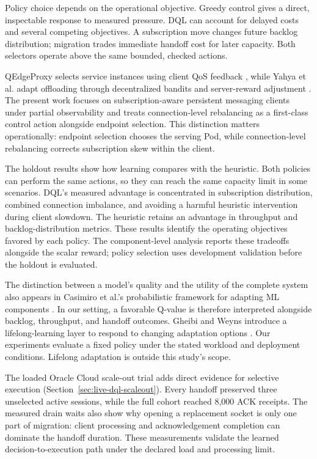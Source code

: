 \documentclass[manuscript,nonacm]{acmart}
\begin{document}
Policy choice depends on the operational objective. Greedy control gives a
direct, inspectable response to measured pressure. DQL can account for delayed
costs and several competing objectives. A subscription move changes future
backlog distribution; migration trades immediate handoff cost for later
capacity. Both selectors operate above the same bounded, checked actions.

QEdgeProxy selects service instances using client QoS feedback
\cite{Cilic2025}, while Yahya et al. adapt offloading through decentralized
bandits and server-reward adjustment \cite{Yahya2024}. The present work
focuses on subscription-aware persistent messaging clients under partial
observability and treats connection-level rebalancing as a first-class
control action alongside endpoint selection. This distinction
matters operationally: endpoint selection chooses the serving Pod, while
connection-level rebalancing corrects subscription skew within the client.

The holdout results show how learning compares with the heuristic.
Both policies can perform the same actions, so they can reach the same
capacity limit in some scenarios.  DQL's measured advantage is concentrated
in subscription distribution, combined connection imbalance, and avoiding a
harmful heuristic intervention during client slowdown.  The heuristic retains
an advantage in throughput and backlog-distribution metrics. These results
identify the operating objectives favored by each policy. The
component-level analysis reports these tradeoffs alongside the scalar reward;
policy selection uses development validation before the holdout is evaluated.

The distinction between a model's quality and the utility of the complete
system also appears in Casimiro et al.'s probabilistic framework for adapting
ML components \cite{Casimiro2024ModelChecking}. In our setting, a favorable
Q-value is therefore interpreted alongside backlog, throughput, and handoff
outcomes. Gheibi and Weyns introduce a lifelong-learning
layer to respond to changing adaptation options
\cite{Gheibi2024AdaptationDrift}. Our experiments evaluate a fixed policy under
the stated workload and deployment conditions. Lifelong adaptation is outside
this study's scope.

The loaded Oracle Cloud scale-out trial adds direct evidence for selective
execution (Section~\ref{sec:live-dql-scaleout}). Every handoff preserved three
unselected active sessions, while the full cohort reached 8,000 ACK receipts.
The measured drain waits also show why opening a replacement socket is only
one part of migration: client processing and acknowledgement completion can
dominate the handoff duration. These measurements validate the learned
decision-to-execution path under the declared load and processing limit.
\end{document}
